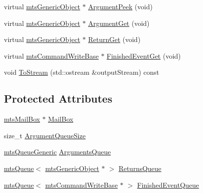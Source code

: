 \begin{DoxyCompactItemize}
virtual \hyperlink{classmts_generic_object}{mts\-Generic\-Object} $\ast$ \hyperlink{classmts_command_queued_write_return_base_a401a5f448de3fccd1fb164443e4950c1}{Argument\-Peek} (void)
\item 
virtual \hyperlink{classmts_generic_object}{mts\-Generic\-Object} $\ast$ \hyperlink{classmts_command_queued_write_return_base_ac990bbaa33da59f15662c78b569bb7d8}{Argument\-Get} (void)
\item 
virtual \hyperlink{classmts_generic_object}{mts\-Generic\-Object} $\ast$ \hyperlink{classmts_command_queued_write_return_base_a46c9521b17082860b27884a880ba2d84}{Return\-Get} (void)
\item 
virtual \hyperlink{classmts_command_write_base}{mts\-Command\-Write\-Base} $\ast$ \hyperlink{classmts_command_queued_write_return_base_ad5cf9aa9b24a5cc8b5e63c727471d748}{Finished\-Event\-Get} (void)
\item 
void \hyperlink{classmts_command_queued_write_return_base_ad9ed47f186820a6bdf3de9f11101fbe0}{To\-Stream} (std\-::ostream \&output\-Stream) const 
\end{DoxyCompactItemize}
\subsection*{Protected Attributes}
\begin{DoxyCompactItemize}
\item 
\hyperlink{classmts_mail_box}{mts\-Mail\-Box} $\ast$ \hyperlink{classmts_command_queued_write_return_base_ab619fecbd720f4b87db6169d1f210e16}{Mail\-Box}
\item 
size\-\_\-t \hyperlink{classmts_command_queued_write_return_base_a3ca30eb9477f0e972799e27948707375}{Argument\-Queue\-Size}
\item 
\hyperlink{classmts_queue_generic}{mts\-Queue\-Generic} \hyperlink{classmts_command_queued_write_return_base_ac846c793220de2f8b31357230428434f}{Arguments\-Queue}
\item 
\hyperlink{classmts_queue}{mts\-Queue}$<$ \hyperlink{classmts_generic_object}{mts\-Generic\-Object} $\ast$ $>$ \hyperlink{classmts_command_queued_write_return_base_a24118cfab2f7edbc060a3513787900c7}{Returns\-Queue}
\item 
\hyperlink{classmts_queue}{mts\-Queue}$<$ \hyperlink{classmts_command_write_base}{mts\-Command\-Write\-Base} $\ast$ $>$ \hyperlink{classmts_command_queued_write_return_base_aea7fcf280a846a7d73fb7ba81499e858}{Finished\-Event\-Queue}
\end{DoxyCompactItemize}


